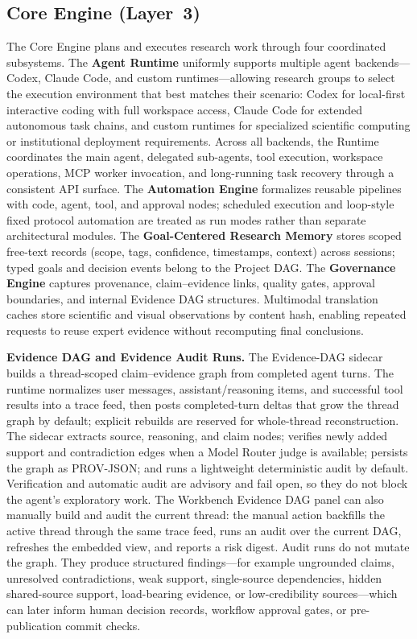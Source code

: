 \documentclass[sn-basic,Numbered,pdflatex]{sn-jnl}
\begin{document}
\subsection{Core Engine (Layer~3)}
The Core Engine plans and executes research work through four coordinated subsystems. The \textbf{Agent Runtime} uniformly supports multiple agent backends---Codex, Claude Code, and custom runtimes---allowing research groups to select the execution environment that best matches their scenario: Codex for local-first interactive coding with full workspace access, Claude Code for extended autonomous task chains, and custom runtimes for specialized scientific computing or institutional deployment requirements. Across all backends, the Runtime coordinates the main agent, delegated sub-agents, tool execution, workspace operations, MCP worker invocation, and long-running task recovery through a consistent API surface. The \textbf{Automation Engine} formalizes reusable pipelines with code, agent, tool, and approval nodes; scheduled execution and loop-style fixed protocol automation are treated as run modes rather than separate architectural modules. The \textbf{Goal-Centered Research Memory} stores scoped free-text records (scope, tags, confidence, timestamps, context) across sessions; typed goals and decision events belong to the Project DAG. The \textbf{Governance Engine} captures provenance, claim--evidence links, quality gates, approval boundaries, and internal Evidence DAG structures. Multimodal translation caches store scientific and visual observations by content hash, enabling repeated requests to reuse expert evidence without recomputing final conclusions.

\textbf{Evidence DAG and Evidence Audit Runs.} The Evidence-DAG sidecar builds a thread-scoped claim--evidence graph from completed agent turns. The runtime normalizes user messages, assistant/reasoning items, and successful tool results into a trace feed, then posts completed-turn deltas that grow the thread graph by default; explicit rebuilds are reserved for whole-thread reconstruction. The sidecar extracts source, reasoning, and claim nodes; verifies newly added support and contradiction edges when a Model Router judge is available; persists the graph as PROV-JSON; and runs a lightweight deterministic audit by default. Verification and automatic audit are advisory and fail open, so they do not block the agent's exploratory work. The Workbench Evidence DAG panel can also manually build and audit the current thread: the manual action backfills the active thread through the same trace feed, runs an audit over the current DAG, refreshes the embedded view, and reports a risk digest. Audit runs do not mutate the graph. They produce structured findings---for example ungrounded claims, unresolved contradictions, weak support, single-source dependencies, hidden shared-source support, load-bearing evidence, or low-credibility sources---which can later inform human decision records, workflow approval gates, or pre-publication commit checks.
\end{document}
